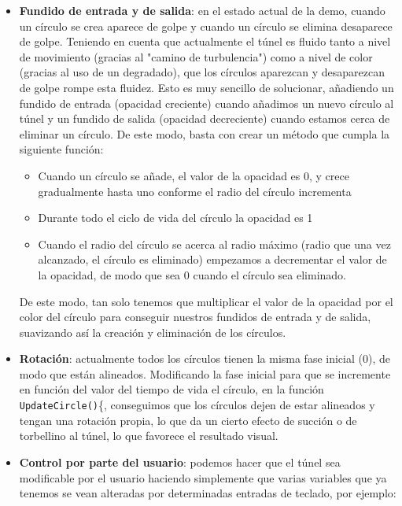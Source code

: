 \begin{itemize}
	\item \textbf{Fundido de entrada y de salida}: en el estado actual de la demo, cuando un círculo se crea aparece de golpe y cuando un círculo se elimina desaparece de golpe. Teniendo en cuenta que actualmente el túnel es fluido tanto a nivel de movimiento (gracias al "camino de turbulencia") como a nivel de color (gracias al uso de un degradado), que los círculos aparezcan y desaparezcan de golpe rompe esta fluidez. Esto es muy sencillo de solucionar, añadiendo un fundido de entrada (opacidad creciente) cuando añadimos un nuevo círculo al túnel y un fundido de salida (opacidad decreciente) cuando estamos cerca de eliminar un círculo. De este modo, basta con crear un método que cumpla la siguiente función:
	
	\begin{itemize}
		\item Cuando un círculo se añade, el valor de la opacidad es 0, y crece gradualmente hasta uno conforme el radio del círculo incrementa
		\item Durante todo el ciclo de vida del círculo la opacidad es 1
		\item Cuando el radio del círculo se acerca al radio máximo (radio que una vez alcanzado, el círculo es eliminado) empezamos a decrementar el valor de la opacidad, de modo que sea 0 cuando el círculo sea eliminado.
	\end{itemize}
	
	De este modo, tan solo tenemos que multiplicar el valor de la opacidad por el color del círculo para conseguir nuestros fundidos de entrada y de salida, suavizando así la creación y eliminación de los círculos.
	
	\item \textbf{Rotación}: actualmente todos los círculos tienen la misma fase inicial (0), de modo que están alineados. Modificando la fase inicial para que se incremente en función del valor del tiempo de vida el círculo, en la función \lstinline{UpdateCircle()}\{, conseguimos que los círculos dejen de estar alineados y tengan una rotación propia, lo que da un cierto efecto de succión o de torbellino al túnel, lo que favorece el resultado visual.
	
	\item \textbf{Control por parte del usuario}: podemos hacer que el túnel sea modificable por el usuario haciendo simplemente que varias variables que ya tenemos se vean alteradas por determinadas entradas de teclado, por ejemplo:
	

\end{itemize}
